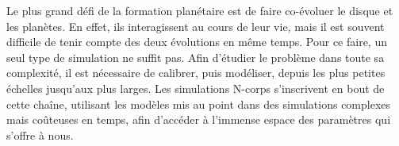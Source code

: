 Le plus grand défi de la formation planétaire est de faire co-évoluer le disque et les planètes. En effet, ils interagissent au cours de leur vie, mais il est souvent difficile de tenir compte des deux évolutions en même temps. Pour ce faire, un seul type de simulation ne suffit pas. Afin d'étudier le problème dans toute sa complexité, il est nécessaire de calibrer, puis modéliser, depuis les plus petites échelles jusqu'aux plus larges. Les simulations N-corps s'inscrivent en bout de cette chaîne, utilisant les modèles mis au point dans des simulations complexes mais coûteuses en temps, afin d'accéder à l'immense espace des paramètres qui s'offre à nous.